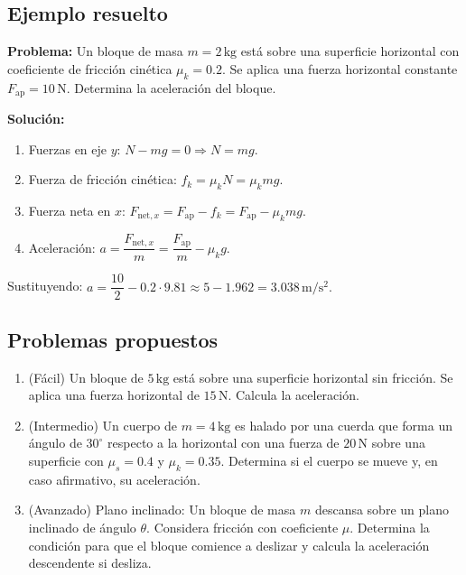 \subsection{Ejemplo resuelto}
\textbf{Problema:} Un bloque de masa $m=2\,\mathrm{kg}$ está sobre una superficie horizontal con coeficiente de fricción cinética $\mu_k=0.2$. Se aplica una fuerza horizontal constante $F_{\text{ap}}=10\,\mathrm{N}$. Determina la aceleración del bloque.


\textbf{Solución:}
\begin{enumerate}
\item Fuerzas en eje $y$: $N - mg = 0 \Rightarrow N = mg$.
\item Fuerza de fricción cinética: $f_k = \mu_k N = \mu_k mg$.
\item Fuerza neta en $x$: $F_{\text{net},x} = F_{\text{ap}} - f_k = F_{\text{ap}} - \mu_k mg$.
\item Aceleración: \( a = \dfrac{F_{\text{net},x}}{m} = \dfrac{F_{\text{ap}}}{m} - \mu_k g. \)
\end{enumerate}


Sustituyendo: \( a = \dfrac{10}{2} - 0.2\cdot 9.81 \approx 5 - 1.962 = 3.038\,\mathrm{m/s^2}. \)


\subsection{Problemas propuestos}
\begin{enumerate}
\item (Fácil) Un bloque de $5\,\mathrm{kg}$ está sobre una superficie horizontal sin fricción. Se aplica una fuerza horizontal de $15\,\mathrm{N}$. Calcula la aceleración.
\item (Intermedio) Un cuerpo de $m=4\,\mathrm{kg}$ es halado por una cuerda que forma un ángulo de $30^\circ$ respecto a la horizontal con una fuerza de $20\,\mathrm{N}$ sobre una superficie con $\mu_s=0.4$ y $\mu_k=0.35$. Determina si el cuerpo se mueve y, en caso afirmativo, su aceleración.
\item (Avanzado) Plano inclinado: Un bloque de masa $m$ descansa sobre un plano inclinado de ángulo $\theta$. Considera fricción con coeficiente $\mu$. Determina la condición para que el bloque comience a deslizar y calcula la aceleración descendente si desliza.
\end{enumerate}


